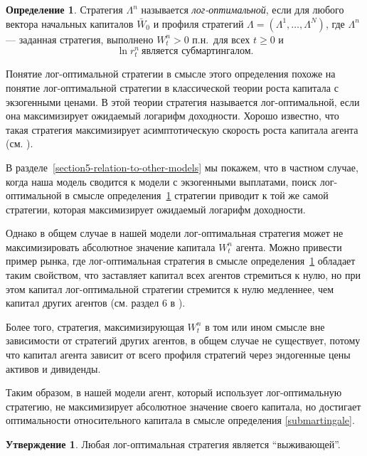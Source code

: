 \documentclass[a4paper,12pt,russian]{article} %
\theoremstyle{definition}
\newtheorem{definition}{Определение}
\newtheorem{proposition}{Утверждение}
\begin{document}
\begin{definition}
\label{def-log-optimal} 
Стратегия $\Lambda^n$ называется \emph{лог-оптимальной}, если  для любого вектора начальных капиталов $\bar W_0$ и профиля стратегий $\Lambda=(\Lambda^1,\ldots,\Lambda^N)$, где $\Lambda^n$ — заданная стратегия, выполнено $W_t^n > 0$ п.н.\ для всех $t\ge 0$ и
\begin{equation}
\label{submartingale}
\ln r_t^n\ \text{является субмартингалом}.
\end{equation}
\end{definition}

Понятие лог-оптимальной стратегии в смысле этого определения похоже на понятие лог-оптимальной стратегии в классической теории роста капитала с экзогенными ценами. В этой теории стратегия называется лог-оптимальной, если она максимизирует ожидаемый логарифм доходности. Хорошо известно, что такая стратегия максимизирует асимптотическую скорость роста капитала агента (см. \cite{AlgoetCover1988}). 

В разделе~\ref{section5-relation-to-other-models} мы покажем, что в частном случае, когда наша модель сводится к модели с экзогенными выплатами, поиск лог-оптимальной в смысле определения~\ref{def-log-optimal} стратегии приводит к той же самой стратегии, которая максимизирует ожидаемый логарифм доходности.

Однако в общем случае в нашей модели лог-оптимальная стратегия может не максимизировать абсолютное значение капитала $W_t^n$ агента. Можно привести пример рынка, где лог-оптимальная стратегия в смысле определения~\ref{def-log-optimal} обладает таким свойством, что заставляет капитал всех агентов стремиться к нулю, но при этом капитал лог-оптимальной стратегии стремится к нулю медленнее, чем капитал других агентов (см. раздел 6 в \cite{DrokinZhitlukhin2020}).

Более того, стратегия, максимизирующая $W_t^n$ в том или ином смысле вне зависимости от стратегий других агентов, в общем случае не существует, потому что капитал агента зависит от всего профиля стратегий через эндогенные цены активов и дивиденды.

Таким образом, в нашей модели агент, который использует лог-оптимальную стратегию, не максимизирует абсолютное значение своего капитала, но достигает оптимальности относительного капитала в смысле определения \eqref{submartingale}.



\begin{proposition}
Любая лог-оптимальная стратегия является ``выживающей''.
\end{proposition}
\end{document}
